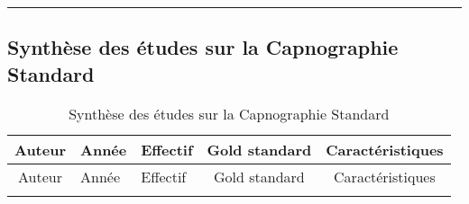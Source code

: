 \documentclass[12pt,]{article}
\begin{document}
\newpage
\begin{landscape}

\begin{center}\rule{0.5\linewidth}{\linethickness}\end{center}

\hypertarget{synthese-des-etudes-sur-la-capnographie-standard-3}{%
\subsection{Synthèse des études sur la Capnographie
Standard}\label{synthese-des-etudes-sur-la-capnographie-standard-3}}

\begin{longtable}[]{@{}cllcc@{}}
\caption{Synthèse des études sur la Capnographie
Standard}\tabularnewline
\toprule
\begin{minipage}[b]{0.31\columnwidth}\centering
Auteur\strut
\end{minipage} & \begin{minipage}[b]{0.05\columnwidth}\raggedright
Année\strut
\end{minipage} & \begin{minipage}[b]{0.06\columnwidth}\raggedright
Effectif\strut
\end{minipage} & \begin{minipage}[b]{0.12\columnwidth}\centering
Gold standard\strut
\end{minipage} & \begin{minipage}[b]{0.32\columnwidth}\centering
Caractéristiques\strut
\end{minipage}\tabularnewline
\midrule
\endfirsthead
\toprule
\begin{minipage}[b]{0.31\columnwidth}\centering
Auteur\strut
\end{minipage} & \begin{minipage}[b]{0.05\columnwidth}\raggedright
Année\strut
\end{minipage} & \begin{minipage}[b]{0.06\columnwidth}\raggedright
Effectif\strut
\end{minipage} & \begin{minipage}[b]{0.12\columnwidth}\centering
Gold standard\strut
\end{minipage} & \begin{minipage}[b]{0.32\columnwidth}\centering
Caractéristiques\strut
\end{minipage}\tabularnewline
\midrule
\endhead
\begin{minipage}[t]{0.31\columnwidth}\centering

\end{minipage}
\end{longtable}
\end{landscape}
\end{document}
